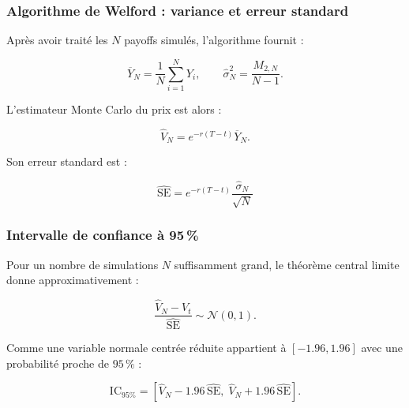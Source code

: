 \documentclass[aspectratio=169,11pt]{beamer}
\begin{document}
\begin{frame}
    \frametitle{Algorithme de Welford : variance et erreur standard}

    Après avoir traité les $N$ payoffs simulés, l'algorithme fournit :

    \[
        \overline{Y}_N
        =
        \frac{1}{N}
        \sum_{i=1}^{N}Y_i,
        \qquad
        \widehat{\sigma}_N^2
        =
        \frac{M_{2,N}}{N-1}.
    \]

    \vspace{0.3cm}

    L'estimateur Monte Carlo du prix est alors :

    \[
        \boxed{
        \widehat{V}_N
        =
        e^{-r(T-t)}\overline{Y}_N.
        }
    \]

    \vspace{0.3cm}

    Son erreur standard est :

    \[
        \boxed{
        \widehat{\mathrm{SE}}
        =
        e^{-r(T-t)}
        \frac{\widehat{\sigma}_N}{\sqrt{N}}
        }
    \]


\end{frame}


\begin{frame}
    \frametitle{Intervalle de confiance à 95\,\%}

    Pour un nombre de simulations $N$ suffisamment grand,
    le théorème central limite donne approximativement :

    \[
        \frac{\widehat{V}_N-V_t}
        {\widehat{\mathrm{SE}}}
        \sim \mathcal{N}(0,1).
    \]

    \vspace{0.35cm}

    Comme une variable normale centrée réduite appartient à
    $[-1.96,1.96]$ avec une probabilité proche de $95\,\%$ :

    \[
        \boxed{
        \mathrm{IC}_{95\%}
        =
        \left[
            \widehat{V}_N-1.96\,\widehat{\mathrm{SE}},
            \;
            \widehat{V}_N+1.96\,\widehat{\mathrm{SE}}
        \right].
        }
    \]


\end{frame}
\end{document}
